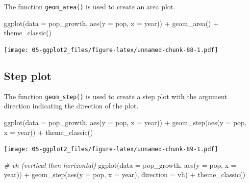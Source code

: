 \documentclass[
]{book}
\newenvironment{Shaded}{\begin{snugshade}}{\end{snugshade}}
\newcommand{\AttributeTok}[1]{\textcolor[rgb]{0.77,0.63,0.00}{#1}}
\newcommand{\CommentTok}[1]{\textcolor[rgb]{0.56,0.35,0.01}{\textit{#1}}}
\newcommand{\FunctionTok}[1]{\textcolor[rgb]{0.00,0.00,0.00}{#1}}
\newcommand{\NormalTok}[1]{#1}
\newcommand{\SpecialCharTok}[1]{\textcolor[rgb]{0.00,0.00,0.00}{#1}}
\newcommand{\StringTok}[1]{\textcolor[rgb]{0.31,0.60,0.02}{#1}}
\begin{document}
The function \texttt{geom\_area()} is used to create an area plot.

\begin{Shaded}
\begin{Highlighting}[]
\FunctionTok{ggplot}\NormalTok{(}\AttributeTok{data =}\NormalTok{ pop\_growth, }\FunctionTok{aes}\NormalTok{(}\AttributeTok{y =}\NormalTok{ pop, }\AttributeTok{x =}\NormalTok{ year)) }\SpecialCharTok{+} 
  \FunctionTok{geom\_area}\NormalTok{() }\SpecialCharTok{+}
  \FunctionTok{theme\_classic}\NormalTok{()}
\end{Highlighting}
\end{Shaded}

\texttt{[image: 05-ggplot2\_files/figure-latex/unnamed-chunk-88-1.pdf]}

\hypertarget{step-plot}{%
\subsection{Step plot}\label{step-plot}}

The function \texttt{geom\_step()} is used to create a step plot with the argument direction indicating the direction of the plot.

\begin{Shaded}
\begin{Highlighting}[]
\FunctionTok{ggplot}\NormalTok{(}\AttributeTok{data =}\NormalTok{ pop\_growth, }\FunctionTok{aes}\NormalTok{(}\AttributeTok{y =}\NormalTok{ pop, }\AttributeTok{x =}\NormalTok{ year)) }\SpecialCharTok{+} 
  \FunctionTok{geom\_step}\NormalTok{(}\FunctionTok{aes}\NormalTok{(}\AttributeTok{y =}\NormalTok{ pop, }\AttributeTok{x =}\NormalTok{ year)) }\SpecialCharTok{+} 
  \FunctionTok{theme\_classic}\NormalTok{()}
\end{Highlighting}
\end{Shaded}

\texttt{[image: 05-ggplot2\_files/figure-latex/unnamed-chunk-89-1.pdf]}

\begin{Shaded}
\begin{Highlighting}[]
\CommentTok{\# vh (vertical then horizontal)}
\FunctionTok{ggplot}\NormalTok{(}\AttributeTok{data =}\NormalTok{ pop\_growth, }\FunctionTok{aes}\NormalTok{(}\AttributeTok{y =}\NormalTok{ pop, }\AttributeTok{x =}\NormalTok{ year)) }\SpecialCharTok{+} 
  \FunctionTok{geom\_step}\NormalTok{(}\FunctionTok{aes}\NormalTok{(}\AttributeTok{y =}\NormalTok{ pop, }\AttributeTok{x =}\NormalTok{ year), }\AttributeTok{direction =} \StringTok{\textquotesingle{}vh\textquotesingle{}}\NormalTok{) }\SpecialCharTok{+}
  \FunctionTok{theme\_classic}\NormalTok{()}
\end{Highlighting}
\end{Shaded}
\end{document}
